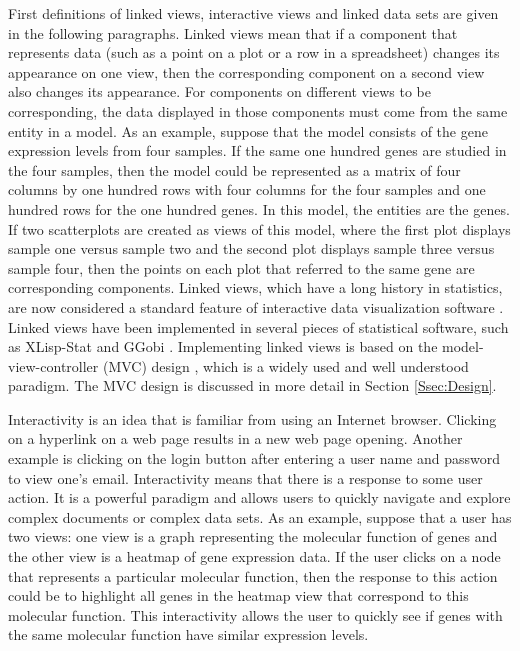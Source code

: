 \documentclass{article}[11pt]
\begin{document}
First definitions of linked views, interactive views and linked data
sets are given in the following paragraphs.  Linked views mean that if a
component that represents data (such as a point on a plot or a row in a
spreadsheet) changes its appearance on one view, then the corresponding
component on a second view also changes its appearance.  For components on
different views to be corresponding, the data displayed in those components
must come from the same entity in a model.  As an example, suppose that the
model consists of the gene expression levels from four samples.  If the same
one hundred genes are studied in the four samples, then the model could be
represented as a matrix of four columns by one hundred rows with four columns
for the four samples and one hundred rows for the one hundred genes.  In this
model, the entities are the genes.  If two scatterplots are created as views
of this model, where the first plot displays sample one versus sample two and
the second plot displays sample three versus sample four, then the points on
each plot that referred to the same gene are corresponding components.  Linked
views, which have a long history in statistics, are now considered a standard
feature of interactive data visualization software \cite{GGobi}.  Linked views
have been implemented in several pieces of statistical software, such as
XLisp-Stat \cite{Lisp} and GGobi \cite{GGobiMan}.  Implementing linked views
is based on the model-view-controller (MVC) design \cite{DesignPatterns},
which is a widely used and well understood paradigm.  The MVC design is
discussed in more detail in Section \ref{Ssec:Design}.

Interactivity is an idea that is familiar from using an Internet browser.
Clicking on a hyperlink on a web page results in a new web page
opening.  Another example is clicking on the login button after entering a
user name and password to view one's email.  Interactivity means that there is
a response to some user action.  It is a powerful paradigm and allows users to
quickly navigate and explore complex documents or complex data sets.  As an
example, suppose that a user has two views: one view is a graph representing
the molecular function of genes and the other view is a heatmap of gene
expression data.  If the user clicks on a node that represents a particular
molecular function, then the response to this action could be to highlight all
genes in the heatmap view that correspond to this molecular function.  This
interactivity allows the user to quickly see if genes with the same molecular
function have similar expression levels. 
\end{document}
